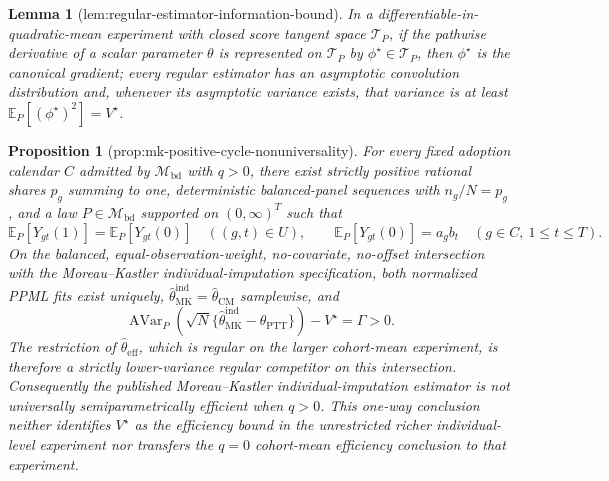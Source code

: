 \documentclass{article}
\newtheorem{lemma}{Lemma}
\newtheorem{proposition}{Proposition}
\begin{document}
\begin{lemma}[lem:regular-estimator-information-bound]\label{lem:regular-estimator-information-bound}
In a differentiable-in-quadratic-mean experiment with closed score tangent space \(\mathcal T_P\), if the pathwise derivative of a scalar parameter \(\theta\) is represented on \(\mathcal T_P\) by \(\phi^{\star}\in\mathcal T_P\), then \(\phi^{\star}\) is the canonical gradient; every regular estimator has an asymptotic convolution distribution and, whenever its asymptotic variance exists, that variance is at least \(\mathbb E_P[(\phi^{\star})^2]=V^{\star}\).
\end{lemma}

\begin{proposition}[prop:mk-positive-cycle-nonuniversality]\label{prop:mk-positive-cycle-nonuniversality}
For every fixed adoption calendar \(C\) admitted by \(\mathcal M_{\mathrm{bd}}\) with \(q>0\), there exist strictly positive rational shares \(p_g\) summing to one, deterministic balanced-panel sequences with \(n_g/N=p_g\), and a law \(P\in\mathcal M_{\mathrm{bd}}\) supported on \((0,\infty)^T\) such that
\[
\mathbb E_P[Y_{gt}(1)]=\mathbb E_P[Y_{gt}(0)]\quad((g,t)\in U),
\qquad
\mathbb E_P[Y_{gt}(0)]=a_gb_t\quad(g\in C,\ 1\le t\le T).
\]
On the balanced, equal-observation-weight, no-covariate, no-offset intersection with the Moreau--Kastler individual-imputation specification, both normalized PPML fits exist uniquely, \(\widehat\theta_{\mathrm{MK}}^{\mathrm{ind}}=\widehat\theta_{\mathrm{CM}}\) samplewise, and
\[
\operatorname{AVar}_P\!\left(\sqrt N\{\widehat\theta_{\mathrm{MK}}^{\mathrm{ind}}-\theta_{\mathrm{PTT}}\}\right)-V^{\star}
=\Gamma>0.
\]
The restriction of \(\widehat\theta_{\mathrm{eff}}\), which is regular on the larger cohort-mean experiment, is therefore a strictly lower-variance regular competitor on this intersection.  Consequently the published Moreau--Kastler individual-imputation estimator is not universally semiparametrically efficient when \(q>0\).  This one-way conclusion neither identifies \(V^{\star}\) as the efficiency bound in the unrestricted richer individual-level experiment nor transfers the \(q=0\) cohort-mean efficiency conclusion to that experiment.
\end{proposition}
\end{document}
